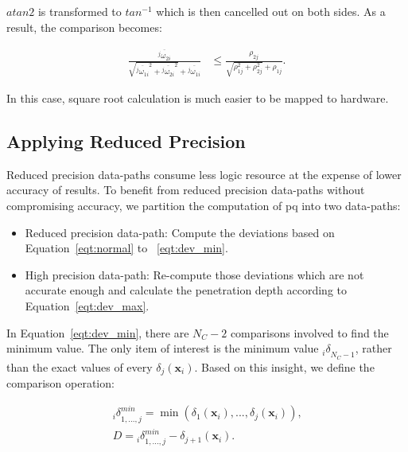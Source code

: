 $atan2$ is transformed to $tan^{-1}$ which is then cancelled out on both sides.
As a result, the comparison becomes:

\begin{equation}
\begin{aligned}
\frac{\overline{{^j\omega}_{2i}}}{\sqrt{\overline{{^j\omega}_{1i}}^2+\overline{{^j\omega}_{2i}}^2}+\overline{{^j\omega}_{1i}}} &\le \frac{\rho_{2j}}{\sqrt{\rho_{1j}^2+\rho_{2j}^2}+\rho_{1j}} \mbox{.}
\end{aligned}
\label{eqt:check3}
\end{equation}

In this case, square root calculation is much easier to be mapped to hardware.

\subsection{Applying Reduced Precision}
\label{sec:precision_mixed_precision}
Reduced precision data-paths consume less logic resource at the expense of lower accuracy of results.
To benefit from reduced precision data-paths without compromising accuracy, we partition the computation of \gls{pq} into two data-paths:

\begin{itemize}
\item Reduced precision data-path: Compute the deviations based on Equation~\ref{eqt:normal} to ~\ref{eqt:dev_min}.
\item High precision data-path: Re-compute those deviations which are not accurate enough and calculate the penetration depth according to Equation~\ref{eqt:dev_max}.
\end{itemize}

In Equation~\ref{eqt:dev_min}, there are $N_C-2$ comparisons involved to find the minimum value.
The only item of interest is the minimum value ${_i\delta}_{N_C-1}$, rather than the exact values of every $\delta_{j}(\boldsymbol{x}_i)$.
Based on this insight, we define the comparison operation:

\begin{equation}
\begin{aligned}
{_i\delta}^{min}_{1,...,j} = \min \left ( {\delta_{1}(\boldsymbol{x}_i),...,\delta_{j}(\boldsymbol{x}_i)} \right ) \mbox{,} \\
D = {_i\delta}^{min}_{1,...,j} - \delta_{j+1}(\boldsymbol{x}_i) \mbox{.}
\end{aligned}
\label{eqt:comparison}
\end{equation}

